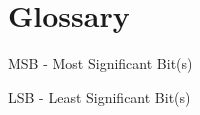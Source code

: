 \section{Glossary}
\begin{list}
\item \label{trm::MSB} MSB  - Most Significant Bit(s)
\item \label{trm::LSB} LSB  - Least Significant Bit(s)


\end{list}